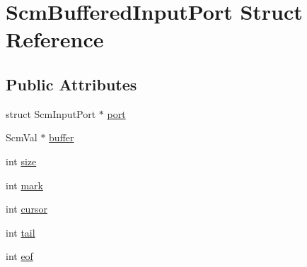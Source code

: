 \hypertarget{struct_scm_buffered_input_port}{\section{Scm\-Buffered\-Input\-Port Struct Reference}
\label{struct_scm_buffered_input_port}
}
\subsection*{Public Attributes}
\begin{DoxyCompactItemize}
\item 
struct Scm\-Input\-Port $\ast$ \hyperlink{struct_scm_buffered_input_port_a91762e8e9c5cde68e3689cc26e7933a5}{port}
\item 
Scm\-Val $\ast$ \hyperlink{struct_scm_buffered_input_port_af2fd325812eeb126f19574021b7fa3fe}{buffer}
\item 
int \hyperlink{struct_scm_buffered_input_port_af550724c6e90343a2b7f8e44570e3be8}{size}
\item 
int \hyperlink{struct_scm_buffered_input_port_af2e2c7b97397b7484d1401b95215ebbe}{mark}
\item 
int \hyperlink{struct_scm_buffered_input_port_a0eb0cdba77d024904df08295d5664dde}{cursor}
\item 
int \hyperlink{struct_scm_buffered_input_port_ab0d75f54a548adc789122db1a80c6e21}{tail}
\item 
int \hyperlink{struct_scm_buffered_input_port_a1d4062d7364c8dbdeb765db604b6fb9c}{eof}
\end{DoxyCompactItemize}


